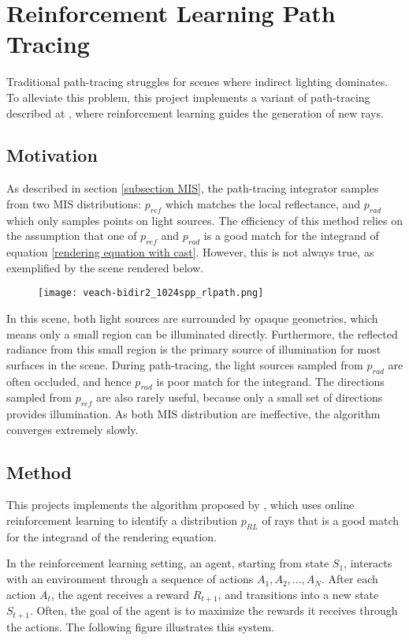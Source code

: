 \chapter{Reinforcement Learning Path Tracing}
\label{chapter RL}
Traditional path-tracing struggles for scenes where indirect lighting dominates. To alleviate this problem, this project implements a variant of path-tracing described at \cite{RLPT}, where reinforcement learning guides the generation of new rays.

\section{Motivation}
As described in section \ref{subsection MIS}, the path-tracing integrator samples from two MIS distributions: $p_{ref}$ which matches the local reflectance, and $p_{rad}$ which only samples points on light sources. The efficiency of this method relies on the assumption that one of $p_{ref}$ and $p_{rad}$ is a good match for the integrand of equation \ref{rendering equation with cast}. However, this is not always true, as exemplified by the scene rendered below.

\begin{figure}[H]
    \centering
    \texttt{[image: veach-bidir2\_1024spp\_rlpath.png]}
\end{figure}

In this scene, both light sources are surrounded by opaque geometries, which means only a small region can be illuminated directly. Furthermore, the reflected radiance from this small region is the primary source of illumination for most surfaces in the scene. During path-tracing, the light sources sampled from $p_{rad}$ are often occluded, and hence $p_{rad}$ is poor match for the integrand. The directions sampled from $p_{ref}$ are also rarely useful, because only a small set of directions provides illumination. As both MIS distribution are ineffective, the algorithm converges extremely slowly.

\section{Method}
This projects implements the algorithm proposed by \cite{RLPT}, which uses online reinforcement learning to identify a distribution $p_{RL}$ of rays that is a good match for the integrand of the rendering equation.

In the reinforcement learning setting, an agent, starting from state $S_1$, interacts with an environment through a sequence of actions $A_1,A_2,...,A_N$. After each action $A_t$, the agent receives a reward $R_{t+1}$, and transitions into a new state $S_{t+1}$. Often, the goal of the agent is to maximize the rewards it receives through the actions. The following figure illustrates this system.

